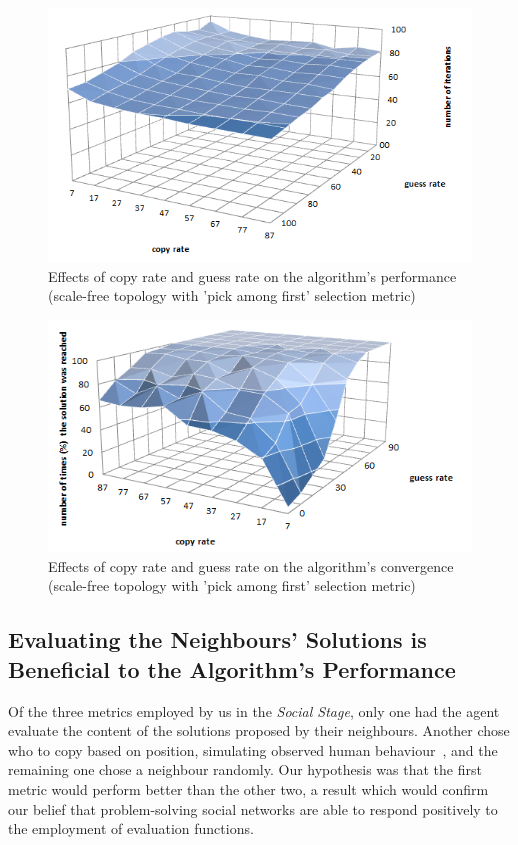 \documentclass{article}
\begin{document}
\begin{figure}
\includegraphics[scale=0.60]{copy_guess_free_prob}
\caption{Effects of copy rate and guess rate on the algorithm's performance (scale-free topology with 'pick among first' selection metric)
}
\label{fig:copy_guess_free_prob}
\end{figure}

\begin{figure}
\includegraphics[scale=0.60]{copy_guess_free_prob_num_solution_reached}
\caption{Effects of copy rate and guess rate on the algorithm's convergence (scale-free topology with 'pick among first' selection metric)
}
\label{fig:copy_guess_free_prob_num_solution_reached}
\end{figure}

\subsection{Evaluating the Neighbours' Solutions is Beneficial to the Algorithm's Performance}

Of the three metrics employed by us in the \emph{Social Stage}, only one had the agent evaluate the content of the solutions proposed by their neighbours. Another chose who to copy based on position, simulating observed human behaviour~\cite{farenzena:collabem}, and the remaining one chose a neighbour randomly. Our hypothesis was that the first metric would perform better than the other two, a result which would confirm our belief that problem-solving social networks are able to respond positively to the employment of evaluation functions.
\end{document}
